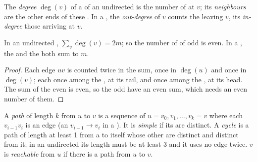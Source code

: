 \begin{definition}[Degree]\label{def:b1:graph-traversals:degree}
The \emph{degree} $\deg(v)$ of a  of an undirected  is the number of  at $v$; its
\emph{neighbours} are the other ends of these . In a , the \emph{out-degree} of
$v$ counts the  leaving $v$, its \emph{in-degree} those arriving at $v$.
\end{definition}

\begin{proposition}\label{prop:b1:graph-traversals:handshake}
In an undirected , $\sum_v \deg(v) = 2m$; so the number of  of odd  is even. In a ,
the  and the  both sum to $m$.
\end{proposition}

\begin{proof}
Each edge $uv$ is counted twice in the sum, once in $\deg(u)$ and once in $\deg(v)$; each  once among the
, at its tail, and once among the , at its head. The sum of the even  is even, so the
odd  have an even sum, which needs an even number of them.
\end{proof}

\begin{definition}\label{def:b1:graph-traversals:path}
A \emph{path} of length $k$ from $u$ to $v$ is a sequence of  $u = v_0, v_1, \dots, v_k = v$
where each $v_{i-1} v_i$ is an edge (an  $v_{i-1} \to v_i$ in a ). It is \emph{simple} if its  are distinct. A \emph{cycle} is a path of length at least 1 from a 
to itself whose other  are distinct and distinct from it; in an undirected  its length must be at least 3
and it uses no edge twice. $v$ is \emph{reachable} from $u$ if there is a path from $u$ to $v$.
\end{definition}

